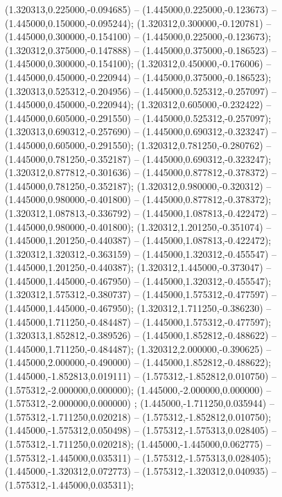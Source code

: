  (1.320313,0.225000,-0.094685) -- (1.445000,0.225000,-0.123673) -- (1.445000,0.150000,-0.095244);
 (1.320312,0.300000,-0.120781) -- (1.445000,0.300000,-0.154100) -- (1.445000,0.225000,-0.123673);
 (1.320312,0.375000,-0.147888) -- (1.445000,0.375000,-0.186523) -- (1.445000,0.300000,-0.154100);
 (1.320312,0.450000,-0.176006) -- (1.445000,0.450000,-0.220944) -- (1.445000,0.375000,-0.186523);
 (1.320313,0.525312,-0.204956) -- (1.445000,0.525312,-0.257097) -- (1.445000,0.450000,-0.220944);
 (1.320312,0.605000,-0.232422) -- (1.445000,0.605000,-0.291550) -- (1.445000,0.525312,-0.257097);
 (1.320313,0.690312,-0.257690) -- (1.445000,0.690312,-0.323247) -- (1.445000,0.605000,-0.291550);
 (1.320312,0.781250,-0.280762) -- (1.445000,0.781250,-0.352187) -- (1.445000,0.690312,-0.323247);
 (1.320312,0.877812,-0.301636) -- (1.445000,0.877812,-0.378372) -- (1.445000,0.781250,-0.352187);
 (1.320312,0.980000,-0.320312) -- (1.445000,0.980000,-0.401800) -- (1.445000,0.877812,-0.378372);
 (1.320312,1.087813,-0.336792) -- (1.445000,1.087813,-0.422472) -- (1.445000,0.980000,-0.401800);
 (1.320312,1.201250,-0.351074) -- (1.445000,1.201250,-0.440387) -- (1.445000,1.087813,-0.422472);
 (1.320312,1.320312,-0.363159) -- (1.445000,1.320312,-0.455547) -- (1.445000,1.201250,-0.440387);
 (1.320312,1.445000,-0.373047) -- (1.445000,1.445000,-0.467950) -- (1.445000,1.320312,-0.455547);
 (1.320312,1.575312,-0.380737) -- (1.445000,1.575312,-0.477597) -- (1.445000,1.445000,-0.467950);
 (1.320312,1.711250,-0.386230) -- (1.445000,1.711250,-0.484487) -- (1.445000,1.575312,-0.477597);
 (1.320313,1.852812,-0.389526) -- (1.445000,1.852812,-0.488622) -- (1.445000,1.711250,-0.484487);
 (1.320312,2.000000,-0.390625) -- (1.445000,2.000000,-0.490000) -- (1.445000,1.852812,-0.488622);
 (1.445000,-1.852813,0.019111) -- (1.575312,-1.852812,0.010750) -- (1.575312,-2.000000,0.000000);
 (1.445000,-2.000000,0.000000) -- (1.575312,-2.000000,0.000000) ;
 (1.445000,-1.711250,0.035944) -- (1.575312,-1.711250,0.020218) -- (1.575312,-1.852812,0.010750);
 (1.445000,-1.575312,0.050498) -- (1.575312,-1.575313,0.028405) -- (1.575312,-1.711250,0.020218);
 (1.445000,-1.445000,0.062775) -- (1.575312,-1.445000,0.035311) -- (1.575312,-1.575313,0.028405);
 (1.445000,-1.320312,0.072773) -- (1.575312,-1.320312,0.040935) -- (1.575312,-1.445000,0.035311);
